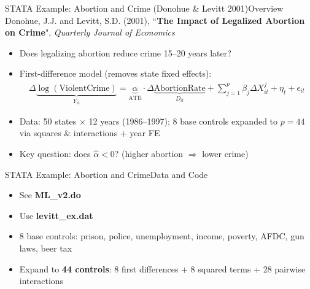 \documentclass[hyperref={pdfpagelabels=false}]{beamer}
\begin{document}
\begin{frame}{STATA Example: Abortion and Crime (Donohue \& Levitt 2001)}{Overview}
	Donohue, J.J. and Levitt, S.D. (2001), ``\textbf{The Impact of Legalized Abortion on Crime}", \textit{Quarterly Journal of Economics}
	\vspace{0.3cm}
	\begin{itemize}
		\item Does legalizing abortion reduce crime 15--20 years later?
		\vspace{0.2cm}
		\item First-difference model (removes state fixed effects):
		\begin{eqnarray*}
			\Delta \underbrace{\log(\text{ViolentCrime})}_{Y_{it}} = \underbrace{\alpha}_{\text{ATE}} \cdot \Delta \underbrace{\text{AbortionRate}}_{D_{it}} + \sum^{p}_{j=1} \beta_{j} \Delta X^{j}_{it} + \eta_{t} + \epsilon_{it}
		\end{eqnarray*}
		\item Data: 50 states $\times$ 12 years (1986--1997); 8 base controls expanded to $p = 44$ via squares \& interactions + year FE
		\vspace{0.2cm}
		\item Key question: does $\hat{\alpha} < 0$? (higher abortion $\Rightarrow$ lower crime)
	\end{itemize}
\end{frame}



\begin{frame}[fragile]{STATA Example: Abortion and Crime}{Data and Code}
	\begin{itemize}
	   \item See \textbf{ML\_v2.do}
		\vspace{0.2cm}
		\item Use \textbf{levitt\_ex.dat}
		\vspace{0.2cm}
		\item 8 base controls: prison, police, unemployment, income, poverty, AFDC, gun laws, beer tax
		\vspace{0.2cm}
		\item Expand to \textbf{44 controls}: 8 first differences + 8 squared terms + 28 pairwise interactions
	\end{itemize}
\end{frame}
\end{document}
